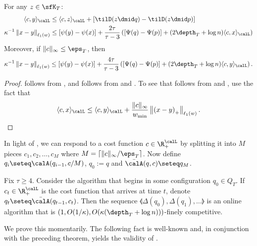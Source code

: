 \begin{theorem}\label{thm:analysis}
	For any $z \in \sfK_T$:
	\begin{align}
	\langle c, y\rangle_{\calL} &\leq \langle c,z\rangle_{\calL} + \left[\tilD(z \dmid q) - \tilD(z \dmid p)\right] \label{eq:sc} \\
	\kappa^{-1} \left\|x-y\right\|_{\ell_1(w)} &\leq [\psi(y)-\psi(x)] + \frac{2 \tau}{\tau-3} \left([\Psi(q)-\Psi(p)] + (2\depth_T + \log n) \langle c, x\rangle_{\calL}\right)\label{eq:mvmtx}
	\end{align}
	Moreover, if $\|c\|_{\infty} \leq \eps_T$, then
	\begin{equation}\label{eq:mvmty}
	\kappa^{-1} \left\|x-y\right\|_{\ell_1(w)} \leq [\psi(y)-\psi(x)] + \frac{4 \tau}{\tau-3} \left( [\Psi(q)-\Psi(p)] + (2\depth_T + \log n) \langle c, y\rangle_{\calL}\right).
	\end{equation}
\end{theorem}

\begin{proof}
	 follows from , and 
	follows from  and .
	To see that  follows from  and , use the fact that
	\[
	\langle c,x \rangle_{\calL} \leq \langle c,y\rangle_{\calL} + \frac{\|c\|_{\infty}}{w_{\min}} \left\|\left(x-y\right)_+\right\|_{\ell_1(w)}.\qedhere
	\]
\end{proof}

In light of , we can respond to a cost function $c \in \R_+^{\calL}$ by splitting it into $M$ pieces
$c_1,c_2,\ldots,c_M$ where $M = \lceil \|c\|_{\infty}/\eps_T\rceil$.
Now define $q_i \seteq \calA(q_{i-1}, c/M)$, $q_0:=q$ and $\bar{\calA}(q,c) \seteq q_M$.

\begin{theorem}
	\label{thm:main-technical}
	Fix $\tau \geq 4$.
	Consider the algorithm that begins in some configuration $q_0 \in Q_T$.
	If $c_t \in \R_+^{\calL}$ is the cost function that arrives at time $t$,
	denote $q_t \seteq \bar{\calA}(q_{t-1},c_t)$.  Then the sequence
	$\llangle \Delta(q_0), \Delta(q_1), \ldots\rrangle$ is an online algorithm
	that is $(1,O(1/\kappa), O(\kappa(\depth_T + \log n)))$-finely competitive.
\end{theorem}

We prove this momentarily.
The following fact is well-known and, in conjunction with the preceding theorem,
yields the validity of
%
%
 .  %

